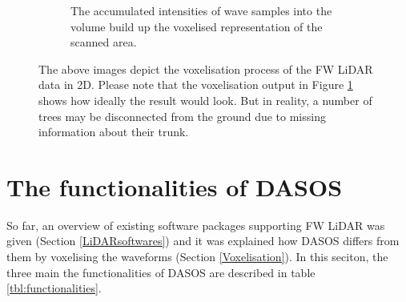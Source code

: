 \documentclass{subfiles}
\begin{document}
\begin{figure} [h!]
\begin{subfigure}[t]{.31\textwidth}
				\caption{The accumulated intensities of wave samples into the volume build up the voxelised representation of the scanned area.} 
				\label{fig:VoxelisationC_voxelised}
			\end{subfigure}
			\caption[Voxelisation of FW LiDAR data]{The above images depict the voxelisation process of the FW LiDAR data in 2D. Please note that the voxelisation output in Figure \ref{fig:VoxelisationC_voxelised} shows how ideally the result would look. But in reality, a number of trees may be disconnected from the ground due to missing information about their trunk.} %
			\label{fig:Voxelisation} 
		\end{figure}
		
	
		
		
	\section{The functionalities of DASOS}\label{DASOS}
	
		\par So far, an overview of existing software packages supporting FW LiDAR was given (Section \ref{LiDARsoftwares}) and it was explained how DASOS differs from them by voxelising the waveforms (Section \ref{Voxelisation}). In this seciton, the three main the functionalities of DASOS are described in table \ref{tbl:functionalities}.
		\newpage
     
\end{document}
